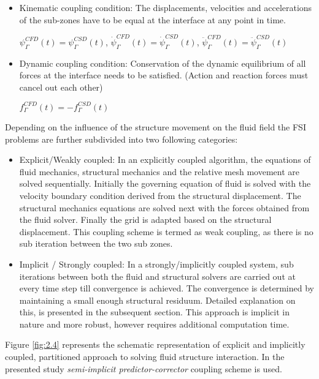 \begin{itemize}
\item Kinematic coupling condition: The displacements, velocities and accelerations of the sub-zones have to be equal at the interface at any point in time.

$\psi^{CFD}_{\Gamma}(t) = \psi^{CSD}_{\Gamma}(t)$, $\dot{\psi}^{CFD}_{\Gamma}(t) = \dot{\psi}^{CSD}_{\Gamma}(t)$, $ \ddot{\psi}^{CFD}_{\Gamma}(t) = \ddot{\psi}^{CSD}_{\Gamma}(t) $

\item Dynamic coupling condition: Conservation of the dynamic equilibrium of all forces at the interface needs to be satisfied. (Action and reaction forces must cancel out each other)

$ f^{CFD}_{\Gamma}(t) = -f^{CSD}_{\Gamma}(t) $
\end{itemize}

Depending on the influence of the structure movement on the fluid field the FSI problems are further subdivided into two following categories:

\begin{itemize}
 \item Explicit/Weakly coupled:	In an explicitly coupled algorithm, the equations of fluid mechanics,
structural mechanics and the relative mesh movement are solved sequentially. Initially the governing equation of fluid is solved with the velocity boundary condition derived from the structural displacement. The structural mechanics equations are solved next with the forces obtained from the fluid solver. Finally the grid is adapted based on the structural displacement. This coupling scheme is termed as weak coupling, as there is no sub iteration between the two sub zones.

 \item Implicit / Strongly coupled: In a strongly/implicitly coupled system, sub iterations between both the fluid and structural solvers are carried out at every time step till convergence is achieved.  The convergence is determined by maintaining a small enough structural residuum. Detailed explanation on this, is presented in the subsequent section. This approach is implicit in nature and more robust, however requires additional computation time.
\end{itemize}

Figure \ref{fig:2.4} represents the schematic representation of explicit and implicitly coupled, partitioned approach to solving fluid structure interaction. In the presented study \textit{semi-implicit predictor-corrector} coupling scheme is used. 

